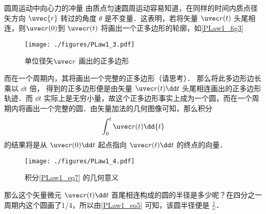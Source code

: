 \begin{example}{圆周运动中向心力的冲量}
由质点匀速圆周运动容易知道，在同样的时间内质点径矢方向 $\uvec{r}$ 转过的角度 $\theta$ 是不变量．这表明，若将矢量 $\uvec r(t)$ 头尾相连，则$\uvec r(0)$到 $\uvec r(t)$ 将画出一个正多边形的轮廓，如\autoref{PLaw1_fig3} 
\begin{figure}[ht]
\centering
\texttt{[image: ./figures/PLaw1\_3.pdf]}
\caption{单位径矢$\uvec r$ 画出的正多边形} \label{PLaw1_fig3}
\end{figure}
而在一个周期内，其将画出一个完整的正多边形（请思考）．
那么将此多边形边长乘以 $\dd t$ 倍， 得到的正多边形便是由矢量 $\uvec r(t)\dd t$ 头尾相连画出的正多边形轨迹．而 $\dd t$ 实际上是无穷小量，故这个正多边形事实上成为一个圆，而在一个周期内将画出一个完整的圆．由矢量加法的几何图像可知，那么积分
\begin{equation}\label{PLaw1_eq7}
\int_{0}^{t}\uvec r(t) \dd{t}
\end{equation}
的结果将是从 $\uvec r(0)\dd t$ 起点指向 $\uvec r(t)\dd t$ 的终点的向量．
\begin{figure}[ht]
\centering
\texttt{[image: ./figures/PLaw1\_4.pdf]}
\caption{积分\autoref{PLaw1_eq7} 的几何意义} \label{PLaw1_fig4}
\end{figure}
那么这个矢量微元 $\uvec r(t)\dd t$ 首尾相连构成的圆的半径是多少呢？在四分之一周期内这个圆画了1/4，所以由\autoref{PLaw1_eq5} 可知，该圆半径便是 $\frac{1}{\omega}$．
\end{example}
